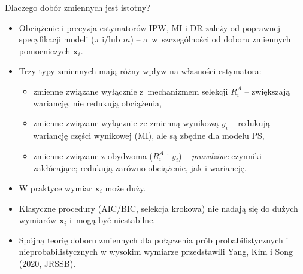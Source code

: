 \documentclass[10pt,ignorenonframetext, aspectratio=169]{beamer}
\newcommand{\bx}{\boldsymbol{x}}
\begin{document}
\begin{frame}{Dlaczego dobór zmiennych jest istotny?}
\begin{itemize}
\justifying
    \item Obciążenie i precyzja estymatorów IPW, MI i DR zależy od poprawnej specyfikacji modeli ($\pi$ i/lub $m$) -- a~w~szczególności od doboru zmiennych pomocniczych $\bx_i$.
    \item Trzy typy zmiennych mają różny wpływ na własności estymatora:
    \begin{itemize}
        \item zmienne związane wyłącznie z~mechanizmem selekcji $R_i^A$ -- zwiększają wariancję, nie redukują obciążenia,
        \item zmienne związane wyłącznie ze zmienną wynikową $y_i$ -- redukują wariancję części wynikowej (MI), ale są zbędne dla modelu PS,
        \item zmienne związane z obydwoma ($R_i^A$ i $y_i$) -- \emph{prawdziwe} czynniki zakłócające; redukują zarówno obciążenie, jak i wariancję.
    \end{itemize}
    \item W praktyce wymiar $\bx_i$ może duży.
    \item Klasyczne procedury (AIC/BIC, selekcja krokowa) nie nadają się do dużych wymiarów $\bx_i$ i~mogą być niestabilne.
    \item Spójną teorię doboru zmiennych dla połączenia prób probabilistycznych i nieprobabilistycznych w wysokim wymiarze przedstawili Yang, Kim i Song (2020, JRSSB).
\end{itemize}
\end{frame}
\end{document}
